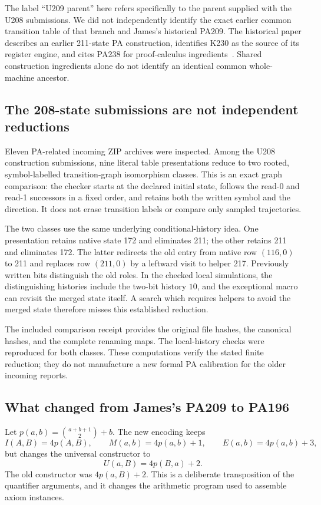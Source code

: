 The label ``U209 parent'' here refers specifically to the parent supplied with the U208 submissions. We did not independently identify the exact earlier common transition table of that branch and James's historical PA209. The historical paper describes an earlier 211-state PA construction, identifies K230 as the source of its register engine, and cites PA238 for proof-calculus ingredients~\cite{previous}. Shared construction ingredients alone do not identify an identical common whole-machine ancestor.

\subsection{The 208-state submissions are not independent reductions}
Eleven PA-related incoming ZIP archives were inspected. Among the U208 construction submissions, nine literal table presentations reduce to two rooted, symbol-labelled transition-graph isomorphism classes. This is an exact graph comparison: the checker starts at the declared initial state, follows the read-0 and read-1 successors in a fixed order, and retains both the written symbol and the direction. It does not erase transition labels or compare only sampled trajectories.

The two classes use the same underlying conditional-history idea. One presentation retains native state 172 and eliminates 211; the other retains 211 and eliminates 172. The latter redirects the old entry from native row \((116,0)\) to 211 and replaces row \((211,0)\) by a leftward visit to helper 217. Previously written bits distinguish the old roles. In the checked local simulations, the distinguishing histories include the two-bit history \(10\), and the exceptional macro can revisit the merged state itself. A search which requires helpers to avoid the merged state therefore misses this established reduction.

The included comparison receipt provides the original file hashes, the canonical hashes, and the complete renaming maps. The local-history checks were reproduced for both classes. These computations verify the stated finite reduction; they do not manufacture a new formal PA calibration for the older incoming reports.

\subsection{What changed from James's PA209 to PA196}
Let \(p(a,b)=\binom{a+b+1}{2}+b\). The new encoding keeps
\[
 I(A,B)=4p(A,B),\qquad M(a,b)=4p(a,b)+1,\qquad E(a,b)=4p(a,b)+3,
\]
but changes the universal constructor to
\[
 U(a,B)=4p(B,a)+2.
\]
The old constructor was \(4p(a,B)+2\). This is a deliberate transposition of the quantifier arguments, and it changes the arithmetic program used to assemble axiom instances.

